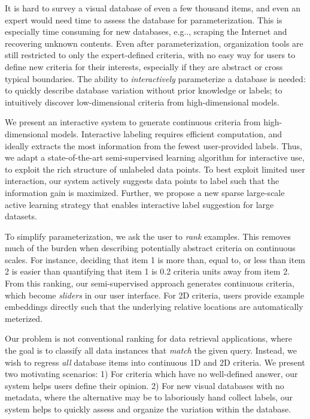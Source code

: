 \documentclass{article}
\makeatletter
\DeclareRobustCommand\onedot{\futurelet\@let@token\@onedot}
\def\@onedot{\ifx\@let@token.\else.\null\fi\xspace}
\def\eg{{e.g}\onedot} \def\Eg{{E.g}\onedot}
\makeatother
\begin{document}
It is hard to survey a visual database of even a few thousand items, and even an expert would need time to assess the database for parameterization. This is especially time consuming for new databases, \eg, scraping the Internet and recovering unknown contents. Even after parameterization, organization tools are still restricted to only the expert-defined criteria, with no easy way for users to define new criteria for their interests, especially if they are abstract or cross typical boundaries. The ability to \emph{interactively} parameterize a database is needed: to quickly describe database variation without prior knowledge or labels; to intuitively discover low-dimensional criteria from high-dimensional models.

We present an interactive system to generate continuous criteria from high-dimensional models. Interactive labeling requires efficient computation, and ideally extracts the most information from the fewest user-provided labels. Thus, we adapt a state-of-the-art semi-supervised learning algorithm for interactive use, to exploit the rich structure of unlabeled data points. To best exploit limited user interaction, our system actively suggests data points to label such that the information gain is maximized. Further, we propose a new sparse large-scale active learning strategy that enables interactive label suggestion for large datasets.

To simplify parameterization, we ask the user to \emph{rank} examples. This removes much of the burden when describing potentially abstract criteria on continuous scales. For instance, deciding that item 1 is more than, equal to, or less than item 2 is easier than quantifying that item 1 is 0.2 criteria units away from item 2. From this ranking, our semi-supervised approach generates continuous criteria, which become \emph{sliders} in our user interface. For 2D criteria, users provide example embeddings directly such that the underlying relative locations are automatically meterized.

Our problem is not conventional ranking for data retrieval applications, where the goal is to classify all data instances that \emph{match} the given query. Instead, we wish to regress \emph{all} database items into continuous 1D and 2D criteria. We present two motivating scenarios: 1) For criteria which have no well-defined answer, our system helps users define their opinion. 2) For new visual databases with no metadata, where the alternative may be to laboriously hand collect labels, our system helps to quickly assess and organize the variation within the database.
\end{document}

